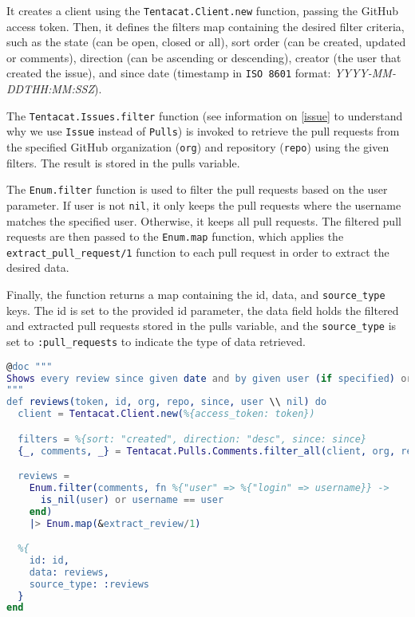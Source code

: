  It creates a client using the \texttt{Tentacat.Client.new} function, passing the GitHub access token. Then, it defines the filters map containing the desired filter criteria, such as the state (can be open, closed or all), sort order (can be created, updated or comments), direction (can be ascending or descending), creator (the user that created the issue), and since date (timestamp in \texttt{ISO 8601} format: \textit{YYYY-MM-DDTHH:MM:SSZ}).\newline

 The \texttt{Tentacat.Issues.filter} function (see information on \ref{issue} to understand why we use \texttt{Issue} instead of \texttt{Pulls}) is invoked to retrieve the pull requests from the specified GitHub organization (\texttt{org}) and repository (\texttt{repo}) using the given filters. The result is stored in the pulls variable.\newline

The \texttt{Enum.filter} function is used to filter the pull requests based on the user parameter. If user is not \texttt{nil}, it only keeps the pull requests where the username matches the specified user. Otherwise, it keeps all pull requests. The filtered pull requests are then passed to the \texttt{Enum.map} function, which applies the \texttt{extract\_pull\_request/1} function to each pull request in order to extract the desired data.\newline

Finally, the function returns a map containing the id, data, and \texttt{source\_type} keys. The id is set to the provided id parameter, the data field holds the filtered and extracted pull requests stored in the pulls variable, and the \texttt{source\_type} is set to \texttt{:pull\_requests} to indicate the type of data retrieved.\newline

\begin{lstlisting}[language=erlang, caption={Reviews extraction of extractor\_github.ex}]
@doc """
Shows every review since given date and by given user (if specified) or all users (if null)
"""
def reviews(token, id, org, repo, since, user \\ nil) do
  client = Tentacat.Client.new(%{access_token: token})

  filters = %{sort: "created", direction: "desc", since: since}
  {_, comments, _} = Tentacat.Pulls.Comments.filter_all(client, org, repo, filters)

  reviews =
    Enum.filter(comments, fn %{"user" => %{"login" => username}} ->
      is_nil(user) or username == user
    end)
    |> Enum.map(&extract_review/1)

  %{
    id: id,
    data: reviews,
    source_type: :reviews
  }
end
\end{lstlisting}

